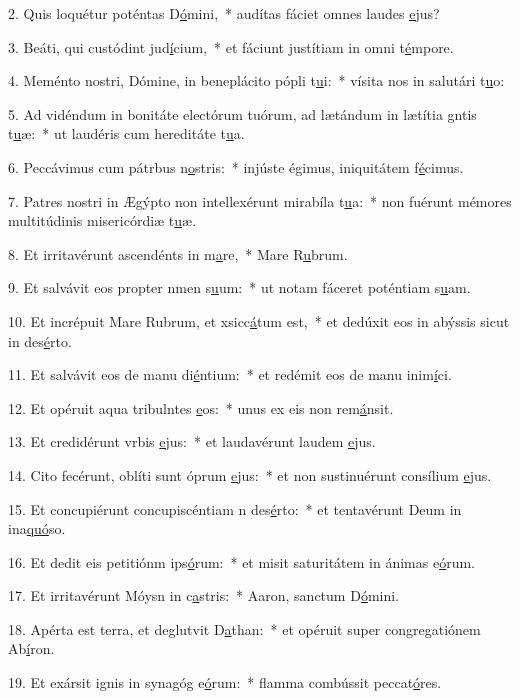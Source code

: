 2. Quis loquétur poténtas D\uline{ó}mini,~* audítas fáciet omnes laudes \uline{e}jus?\par 
3. Beáti, qui custódint jud\uline{í}cium,~* et fáciunt justítiam in omni t\uline{é}mpore.\par 
4. Meménto nostri, Dómine, in beneplácito pópli t\uline{u}i:~* vísita nos in salutári t\uline{u}o:\par 
5. Ad vidéndum in bonitáte electórum tuórum, ad lætándum in lætítia gntis t\uline{u}æ:~* ut laudéris cum hereditáte t\uline{u}a.\par 
6. Peccávimus cum pátrbus n\uline{o}stris:~* injúste égimus, iniquitátem f\uline{é}cimus.\par 
7. Patres nostri in Ægýpto non intellexérunt mirabíla t\uline{u}a:~* non fuérunt mémores multitúdinis misericórdiæ t\uline{u}æ.\par 
8. Et irritavérunt ascendénts in m\uline{a}re,~* Mare R\uline{u}brum.\par 
9. Et salvávit eos propter nmen s\uline{u}um:~* ut notam fáceret poténtiam s\uline{u}am.\par 
10. Et incrépuit Mare Rubrum, et xsicc\uline{á}tum est,~* et dedúxit eos in abýssis sicut in des\uline{é}rto.\par 
11. Et salvávit eos de manu di\uline{é}ntium:~* et redémit eos de manu inim\uline{í}ci.\par 
12. Et opéruit aqua tribulntes \uline{e}os:~* unus ex eis non rem\uline{á}nsit.\par 
13. Et credidérunt vrbis \uline{e}jus:~* et laudavérunt laudem \uline{e}jus.\par 
14. Cito fecérunt, oblíti sunt óprum \uline{e}jus:~* et non sustinuérunt consílium \uline{e}jus.\par 
15. Et concupiérunt concupiscéntiam n des\uline{é}rto:~* et tentavérunt Deum in ina\uline{quó}so.\par 
16. Et dedit eis petitiónm ips\uline{ó}rum:~* et misit saturitátem in ánimas e\uline{ó}rum.\par 
17. Et irritavérunt Móysn in c\uline{a}stris:~* Aaron, sanctum D\uline{ó}mini.\par 
18. Apérta est terra, et deglutvit D\uline{a}than:~* et opéruit super congregatiónem Ab\uline{í}ron.\par 
19. Et exársit ignis in synagóg e\uline{ó}rum:~* flamma combússit peccat\uline{ó}res.\par 
